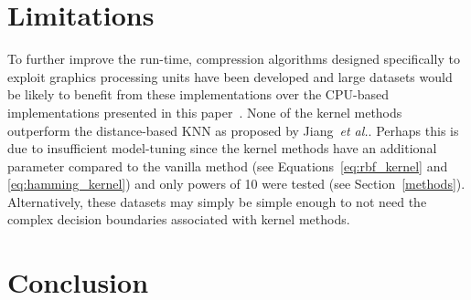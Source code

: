 \documentclass[preprint,12pt]{article}
\begin{document}
\section{Limitations}
\label{limitations}


To further improve the run-time, compression algorithms designed specifically to exploit graphics processing units have been developed and large datasets would be likely to benefit from these implementations over the CPU-based implementations presented in this paper~\cite{gpu_compression}. 
None of the kernel methods outperform the distance-based KNN as proposed by Jiang~\textit{et al.}. 
Perhaps this is due to insufficient model-tuning since the kernel methods have an additional parameter compared to the vanilla method (see Equations~\ref{eq:rbf_kernel} and \ref{eq:hamming_kernel}) and only powers of 10 were tested (see Section~\ref{methods}). 
Alternatively, these datasets may simply be simple enough to not need the complex decision boundaries associated with kernel methods.




\section{Conclusion}
\label{conclusion}
\end{document}
